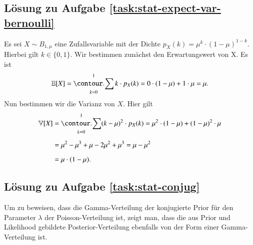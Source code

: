 \subsection*{Lösung zu Aufgabe \ref{task:stat-expect-var-bernoulli}}

Es sei $X \sim B_{1, \mu}$ eine Zufallsvariable mit der Dichte $p_X(k) = \mu^k \cdot (1 - \mu)^{1 - k}$. Hierbei gilt $k \in \{ 0, 1 \}$. Wir bestimmen zunächst den Erwartungswert von X. Es ist
\begin{equation*}
	\E[X]
		= \sum_{k=0}^1 k \cdot p_X(k)
		= 0 \cdot (1 - \mu) + 1 \cdot \mu
		= \mu.
\end{equation*}
Nun bestimmen wir die Varianz von $X$. Hier gilt
\begin{align*}
	\V[X]
		&= \sum_{k=0}^1 (k - \mu)^2 \cdot p_X(k)
			= \mu^2 \cdot (1 - \mu) + (1 - \mu)^2 \cdot \mu
\\[2mm]
		&= \mu^2 - \mu^3 + \mu - 2 \mu^2 + \mu^3
			= \mu - \mu^2
\\[2mm]
		&= \mu \cdot (1 - \mu).
\end{align*}


\subsection*{Lösung zu Aufgabe \ref{task:stat-conjug}}

Um zu beweisen, dass die Gamma-Verteilung der konjugierte Prior für den Parameter $\lambda$ der Poisson-Verteilung ist, zeigt man, dass die aus Prior und Likelihood gebildete Posterior-Verteilung ebenfalls von der Form einer Gamma-Verteilung ist.

